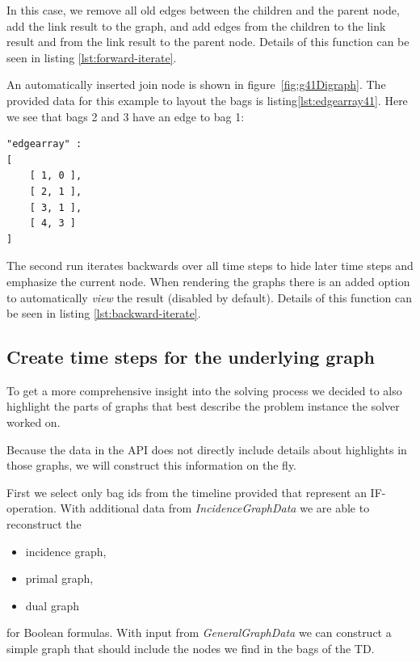 \documentclass[a4paper, 12pt, bibliography=totoc]{scrartcl}
\begin{document}
In this case, we remove all old edges between the children and the parent node, add the link result to the graph, and add edges from the children to the link result and from the link result to the parent node. Details of this function can be seen in listing \ref{lst:forward-iterate}.

An automatically inserted join node is shown in figure~\ref{fig:g41Digraph}.
The provided data for this example to layout the bags is listing\ref{lst:edgearray41}. Here we see that bags 2 and 3 have an edge to bag 1:

\begin{lstlisting}[caption={Structure provided for bags of example \ref{fig:g41Digraph} },label={lst:edgearray41},numbers=none,backgroundcolor=\color{white}]
"edgearray" : 
[
	[ 1, 0 ],
	[ 2, 1 ],
	[ 3, 1 ],
	[ 4, 3 ]
]
\end{lstlisting}

The second run iterates backwards over all time steps to hide later time steps and emphasize the current node.
When rendering the graphs there is an added option to automatically \textit{view} the result (disabled by default). Details of this function can be seen in listing \ref{lst:backward-iterate}.

\subsection{Create time steps for the underlying graph}
To get a more comprehensive insight into the solving process we decided to also highlight the parts of graphs that best describe the problem instance the solver worked on.

Because the data in the API does not directly include details about highlights in those graphs, we will construct this information on the fly.

First we select only bag ids from the timeline provided that represent an IF-operation.
With additional data from \textit{IncidenceGraphData} we are able to reconstruct the
\begin{itemize}
	\item incidence graph,
	\item primal graph,
	\item dual graph
\end{itemize}
for Boolean formulas.
With input from \textit{GeneralGraphData} we can construct a simple graph that should include the nodes we find in the bags of the TD.
\end{document}
